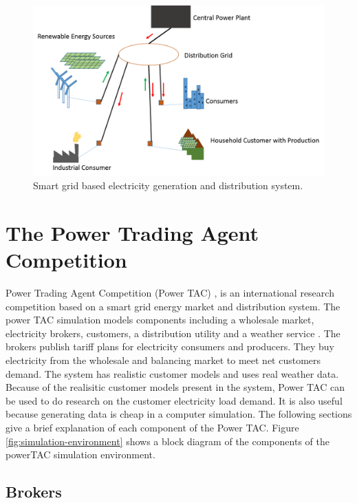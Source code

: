 \begin{figure}[h]
  \includegraphics[width=\linewidth]{smart-grid.png}
  \caption{Smart grid based electricity generation and distribution system.}
  \label{fig:smartgrid}
\end{figure}

\section{The Power Trading Agent Competition}

Power Trading Agent Competition (Power TAC) \cite{ketter2013power, ketter20162016}, is an international research competition based on a smart grid energy market and distribution system. The power TAC simulation models components including a wholesale market, electricity brokers, customers, a distribution utility and a weather service \cite{ketter20162016}. The brokers publish tariff plans for electricity consumers and producers. They buy electricity from the wholesale and balancing market to meet net customers demand. The system has realistic customer models and uses real weather data. Because of the realisitic customer models present in the system, Power TAC can be used to do research on the customer electricity load demand. It is also useful because generating data is cheap in a computer simulation. The following sections give a brief explanation of each component of the Power TAC. Figure \ref{fig:simulation-environment}  shows a block diagram of the components of the powerTAC simulation environment.

\subsection{Brokers}

